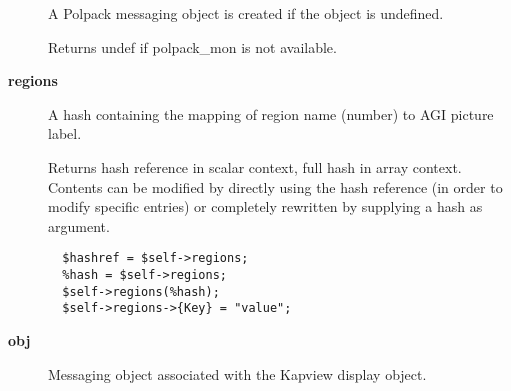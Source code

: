\begin{description}
A Polpack messaging object is created if the object is undefined.



Returns undef if polpack\_mon is not available.


\item[\textbf{regions}] \mbox{}

A hash containing the mapping of region name (number) to
AGI picture label.



Returns hash reference in scalar context, full hash in array context.
Contents can be modified by directly using the hash reference
(in order to modify specific entries) or completely rewritten by
supplying a hash as argument.

\begin{verbatim}
  $hashref = $self->regions;
  %hash = $self->regions;
  $self->regions(%hash);
  $self->regions->{Key} = "value";
\end{verbatim}

\item[\textbf{obj}] \mbox{}

Messaging object associated with the Kapview display object.

\end{description}
